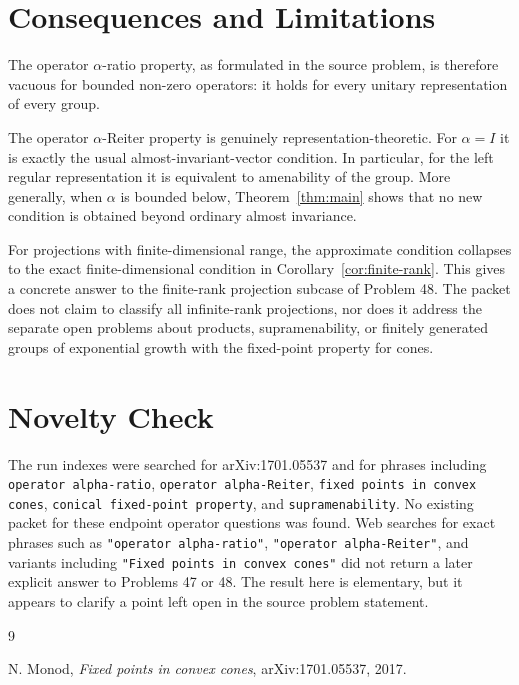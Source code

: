 \documentclass[11pt]{article}
\begin{document}
\section*{Consequences and Limitations}

The operator $\alpha$-ratio property, as formulated in the source problem, is
therefore vacuous for bounded non-zero operators: it holds for every unitary
representation of every group.

The operator $\alpha$-Reiter property is genuinely representation-theoretic.
For $\alpha=I$ it is exactly the usual almost-invariant-vector condition.  In
particular, for the left regular representation it is equivalent to
amenability of the group.  More generally, when $\alpha$ is bounded below,
Theorem~\ref{thm:main} shows that no new condition is obtained beyond ordinary
almost invariance.

For projections with finite-dimensional range, the approximate condition
collapses to the exact finite-dimensional condition in
Corollary~\ref{cor:finite-rank}.  This gives a concrete answer to the
finite-rank projection subcase of Problem 48.  The packet does not claim to
classify all infinite-rank projections, nor does it address the separate open
problems about products, supramenability, or finitely generated groups of
exponential growth with the fixed-point property for cones.

\section*{Novelty Check}

The run indexes were searched for arXiv:1701.05537 and for phrases including
\texttt{operator alpha-ratio}, \texttt{operator alpha-Reiter},
\texttt{fixed points in convex cones}, \texttt{conical fixed-point property},
and \texttt{supramenability}.  No existing packet for these endpoint operator
questions was found.  Web searches for exact phrases such as
\texttt{"operator alpha-ratio"}, \texttt{"operator alpha-Reiter"}, and
variants including \texttt{"Fixed points in convex cones"} did not return a
later explicit answer to Problems 47 or 48.  The result here is elementary,
but it appears to clarify a point left open in the source problem statement.

\begin{thebibliography}{9}

N. Monod,
\emph{Fixed points in convex cones},
arXiv:1701.05537, 2017.

\end{thebibliography}
\end{document}
